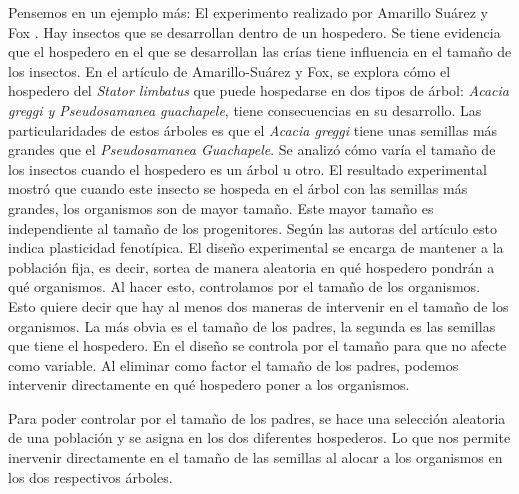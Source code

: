 Pensemos en un ejemplo más: El experimento realizado por Amarillo Suárez y Fox \citeyear{Amarillo-Suarez2006}. Hay insectos que se desarrollan dentro de un hospedero. Se tiene evidencia que el hospedero en el que se desarrollan las crías tiene influencia en el tamaño de los insectos. En el artículo de Amarillo-Suárez y Fox, se explora cómo el hospedero del \emph{Stator limbatus} que puede hospedarse en dos tipos de árbol: \emph{Acacia greggi y Pseudosamanea guachapele}, tiene consecuencias en su desarrollo. Las particularidades de estos árboles es que el \emph{Acacia greggi} tiene unas semillas más grandes que el \emph{Pseudosamanea Guachapele}. Se analizó cómo varía el tamaño de los insectos cuando el hospedero es un árbol u otro. El resultado experimental mostró que cuando este insecto se hospeda en el árbol con las semillas más grandes, los organismos son de mayor tamaño. Este mayor tamaño es independiente al tamaño de los progenitores. Según las autoras del artículo esto indica plasticidad fenotípica. El diseño experimental se encarga de mantener a la población fija, es decir, sortea de manera aleatoria en qué hospedero pondrán a qué organismos. Al hacer esto, controlamos por el tamaño de los organismos. Esto quiere decir que hay al menos dos maneras de intervenir en el tamaño de los organismos. La más obvia es el tamaño de los padres, la segunda es las semillas que tiene el hospedero. En el diseño se controla por el tamaño para que no afecte como variable. Al eliminar como factor el tamaño de los padres, podemos intervenir directamente en qué hospedero poner a los organismos.

\begin{center}
\end{center}


Para poder controlar por el tamaño de los padres, se hace una selección aleatoria de una población y se asigna en los dos diferentes hospederos. Lo que nos permite inervenir directamente en el tamaño de las semillas al alocar a los organismos en los dos respectivos árboles.

\begin{center}
\end{center}

